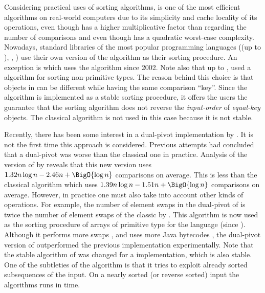 Considering practical uses of sorting algorithms, \quicksort is one of the most
efficient algorithms on real-world computers due to its simplicity and cache
locality of its operations, even though \quicksort has a higher
multiplicative factor than \mergesort regarding the number of
comparisons and even though \quicksort has a quadratic worst-case complexity. Nowadays, standard libraries of the most
popular programming languages (\Java (up to ), \CC, \CXX) use their own
version of the \quicksort algorithm as their sorting procedure. An exception is
\Python which uses the \timsort algorithm since 2002. Note also that up to , \Java used a \mergesort algorithm for sorting non-primitive types. The
reason behind this choice is that objects in \Java can be different while
having the same comparison ``key''. Since the \Java \mergesort algorithm is
implemented as a stable sorting procedure, it offers the users the guarantee
that the sorting algorithm does not reverse the \emph{input-order} of
\emph{equal-key} objects.
The classical \quicksort algorithm is not used in this case because it is not
stable.

Recently, there has been some interest in a dual-pivot \quicksort
implementation by \citet*{yaroslavskiy:2009}. It is not the first time this
approach is considered. Previous attempts \cite{sedgewick:1980} had concluded
that a dual-pivot \quicksort was worse than the classical one in practice.
Analysis of the version of \citet*{yaroslavskiy:2009} by \citet*{wild:2012}
reveals that this new version uses \(1.32n \log n - 2.46n + \BigO{\log n}\)
comparisons on average. This is less than the classical \quicksort algorithm which uses
\(1.39n \log n - 1.51n + \BigO{\log n}\) comparisons on average. However, in practice one must also take into account
other kinds of operations. For example, the number of element swaps in the
dual-pivot \quicksort of \citeauthor{yaroslavskiy:2009} is twice the number of
element swaps of the classic \quicksort by \citeauthor{hoare:1962}. This
algorithm is now used as the sorting procedure of arrays of primitive type for
the \Java language (since ). Although it performs more
swaps \cite{wild:2012}, and uses more Java bytecodes \cite{wild:2013}, the
dual-pivot version of \citet*{yaroslavskiy:2009} outperformed the previous
\quicksort implementation experimentally. Note that the stable \mergesort
algorithm of  was changed for a \timsort implementation, which is
also stable. One of the subtleties of the \timsort algorithm is that it tries
to exploit already sorted subsequences of the input. On a nearly sorted (or
reverse sorted) input the \timsort algorithms runs in  time.

